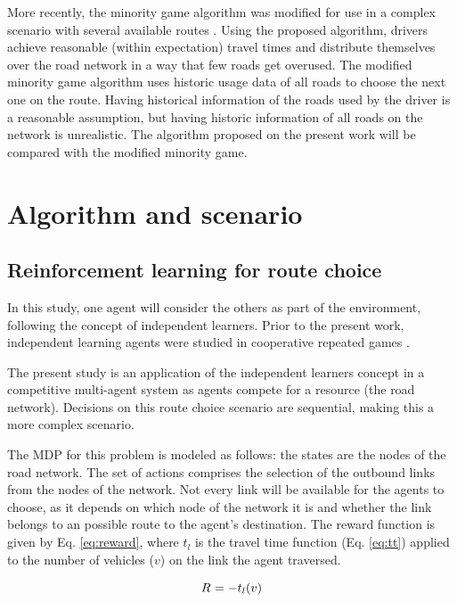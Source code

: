 \documentclass[12pt]{llncs}
\newcommand{\travTime}{\ensuremath{t_l}} 	%
\newcommand{\veh}{\ensuremath{v}}		%
\newcommand{\reward}[1][]{\ensuremath{R_#1}}	%
\begin{document}
More recently, the minority game algorithm was modified for use in a complex scenario with several available routes \cite{Galib&Moser2011}. Using the proposed algorithm, drivers achieve reasonable (within expectation) travel times and distribute themselves over the road network in a way that few roads get overused. The modified minority game algorithm uses historic usage data of all roads to choose the next one on the route. Having historical information of the roads used by the driver is a reasonable assumption, but having historic information of all roads on the network is unrealistic. The algorithm proposed on the present work will be compared with the modified minority game. 

\section{Algorithm and scenario}
\label{sec:proposal}

\subsection{Reinforcement learning for route choice}

In this study, one agent will consider the others as part of the environment, following the concept of independent learners. Prior to the present work, independent learning agents were studied in cooperative repeated games \cite{Claus&Boutilier1998, Tan1993, Sen+1994}.

The present study is an application of the independent learners concept in a competitive multi-agent system as agents compete for a resource (the road network). Decisions on this route choice scenario are sequential, making this a more complex scenario. %

The MDP for this problem is modeled as follows: the states are the nodes of the road network. The set of actions comprises the selection of the outbound links from the nodes of the network. Not every link will be available for the agents to choose, as it depends on which node of the network it is and whether the link belongs to an possible route to the agent's destination. The reward function is given by Eq. \eqref{eq:reward}, where $\travTime$ is the travel time function (Eq. \eqref{eq:tt}) applied to the number of vehicles ($\veh$) on the link the agent traversed.

\begin{equation}
\label{eq:reward}
\reward{} = - \travTime(\veh)
\end{equation}
\end{document}
